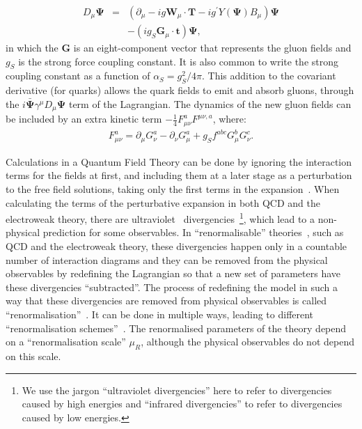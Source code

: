 \begin{eqnarray}
\displaystyle
D_{\mu} \mathbf{\Psi}&=&(\partial_\mu - i g \mathbf{W}_\mu \cdot \mathbf{T} - i g^{\prime} Y(\mathbf{\Psi}) B_\mu ) \mathbf{\Psi} \nonumber \\
&& - (i g_S \mathbf{G}_\mu \cdot \mathbf{t}) \mathbf{\Psi},
\label{eq:dcov_qcd}
\end{eqnarray}
in which the $\mathbf{G}$ is an eight-component vector that represents the gluon fields
and $g_S$ is the strong force coupling constant.
It is also common to write the strong coupling constant
as a function of $\alpha_S = g_S^2/4\pi$.
This addition to the covariant derivative (for quarks) allows the quark fields to emit and absorb gluons, through the $i \bar{\mathbf{\Psi}} \gamma^\mu D_\mu \mathbf{\Psi}$ term
of the Lagrangian.
The dynamics of the new gluon fields can be included by an extra kinetic term $- \frac{1}{4} F_{\mu\nu}^a F^{\mu\nu,a}$, where:
\begin{eqnarray}
\displaystyle
F_{\mu\nu}^a = \partial_\mu G^a_\nu - \partial_\nu G^a_\mu + g_S f^{abc} G^b_\mu G^c_\nu.
\label{eq:gluon_gauge}
\end{eqnarray}

Calculations in a Quantum Field Theory can be done by ignoring the interaction terms for the fields at first, and including them at a later stage as a perturbation
to the free field solutions, taking only the first terms in the expansion~\cite{qft}. When calculating the terms of the perturbative expansion in both QCD and the electroweak
theory, there are ultraviolet~\cite{qft} divergencies~\footnote{We use the jargon ``ultraviolet divergencies'' here to refer to divergencies caused by high energies
and ``infrared divergencies'' to refer to divergencies caused by low energies.}, which lead to a non-physical prediction for some observables.
In ``renormalisable'' theories~\cite{qft},
such as QCD and the electroweak theory, these divergencies happen only in a countable number of interaction diagrams and they can be removed from the physical
observables by redefining the Lagrangian so that a new set of parameters have these divergencies ``subtracted''. The process of redefining the model in such a way
that these divergencies are removed from physical observables is called ``renormalisation''~\cite{qft}. It can be done in multiple ways, leading
to different ``renormalisation schemes''~\cite{qft}. The renormalised parameters of the theory depend on a ``renormalisation scale'' $\mu_R$, although the physical
observables do not depend on this scale.


